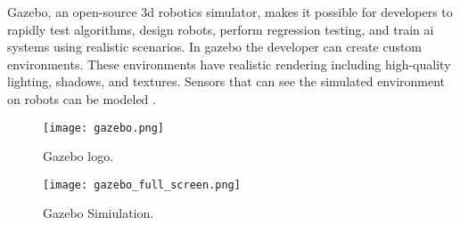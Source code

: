 
Gazebo, an open-source \acs{3d} robotics simulator, makes it possible for developers to rapidly test algorithms, design robots, 
perform regression testing, 
and train \acs{ai} systems using realistic scenarios. In gazebo the developer can create custom environments. 
These environments have realistic rendering including high-quality lighting, shadows, and textures. 
Sensors that can see the simulated environment on robots can be modeled \cite{gazebo:org}.

\begin{figure}[ht]
    \centering
    \texttt{[image: gazebo.png]}
    \caption[Gazebo logo]{Gazebo logo\footnotemark.}
\end{figure}

\begin{figure}[ht]
    \centering
    \texttt{[image: gazebo\_full\_screen.png]}
    \caption[Gazebo Simiulation with 3 UAVs]{Gazebo Simiulation\footnotemark.}
\end{figure}
\newpage